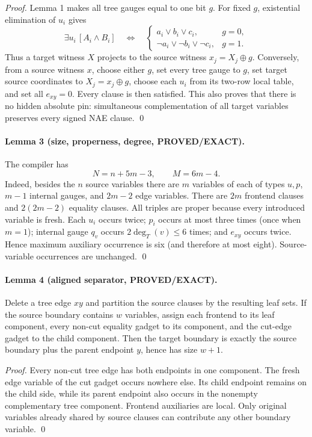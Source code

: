 \emph{Proof.} Lemma 1 makes all tree gauges equal to one bit $g$.  For fixed
$g$, existential elimination of $u_i$ gives
\[
 \exists u_i\,[A_i\wedge B_i]
 \quad\Longleftrightarrow\quad
 \begin{cases}
 a_i\vee b_i\vee c_i,&g=0,\\
 \neg a_i\vee\neg b_i\vee\neg c_i,&g=1.
 \end{cases}
\]
Thus a target witness $X$ projects to the source witness
$x_j=X_j\oplus g$.  Conversely, from a source witness $x$, choose either
$g$, set every tree gauge to $g$, set target source coordinates to
$X_j=x_j\oplus g$, choose each $u_i$ from its two-row local table, and set all
$e_{xy}=0$.  Every clause is then satisfied.  This also proves that there is
no hidden absolute pin: simultaneous complementation of all target variables
preserves every signed NAE clause. \qed

\paragraph{Lemma 3 (size, properness, degree, PROVED/EXACT).}
The compiler has
\[
 N=n+5m-3,\qquad M=6m-4.
\]
Indeed, besides the $n$ source variables there are $m$ variables of each of
types $u,p$, $m-1$ internal gauges, and $2m-2$ edge variables.  There are
$2m$ frontend clauses and $2(2m-2)$ equality clauses.  All triples are proper
because every introduced variable is fresh.  Each $u_i$ occurs twice;
$p_i$ occurs at most three times (once when $m=1$); internal gauge
$q_v$ occurs $2\deg_T(v)\leq6$ times; and $e_{xy}$ occurs twice.  Hence maximum
auxiliary occurrence is six (and therefore at most eight).  Source-variable
occurrences are unchanged. \qed

\paragraph{Lemma 4 (aligned separator, PROVED/EXACT).}
Delete a tree edge $xy$ and partition the source clauses by the resulting leaf
sets.  If the source boundary contains $w$ variables, assign each frontend to
its leaf component, every non-cut equality gadget to its component, and the
cut-edge gadget to the child component.  Then the target boundary is exactly
the source boundary plus the parent endpoint $y$, hence has size $w+1$.

\emph{Proof.} Every non-cut tree edge has both endpoints in one component.
The fresh edge variable of the cut gadget occurs nowhere else.  Its child
endpoint remains on the child side, while its parent endpoint also occurs in
the nonempty complementary tree component.  Frontend auxiliaries are local.
Only original variables already shared by source clauses can contribute any
other boundary variable. \qed

